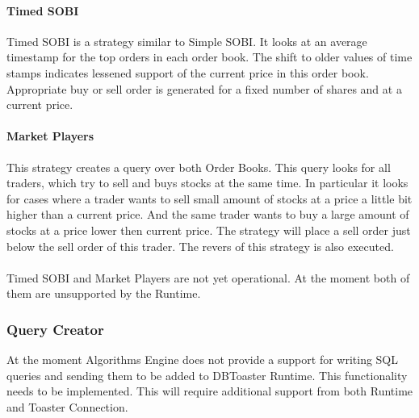 \documentclass[14pt]{article}
\begin{document}
\paragraph{Timed SOBI}

Timed SOBI is a strategy similar to Simple SOBI. It looks at an average timestamp for the top orders in each order book. The shift to older values of time stamps indicates lessened support of the current price in this order book. Appropriate buy or sell order is generated for a fixed number of shares and at a current price. 

\paragraph{Market Players}
 

This strategy creates a query over both Order Books. This query looks for all traders, which try to sell and buys stocks at the same time. In particular it looks for cases where a trader wants to sell small amount of stocks at a price a little bit higher than a current price. And the same trader wants to buy a large amount of stocks at a price lower then current price. The strategy will place a sell order just below the sell order of this trader. The revers of this strategy is also executed.
\\
\\
Timed SOBI and Market Players are not yet operational. At the moment both of them are unsupported by the Runtime.


\subsubsection{Query Creator}

At the moment Algorithms Engine does not provide a support for writing SQL queries and sending them to be added to DBToaster Runtime. This functionality needs to be implemented. This will require additional support from both Runtime and Toaster Connection.

\end{document}
